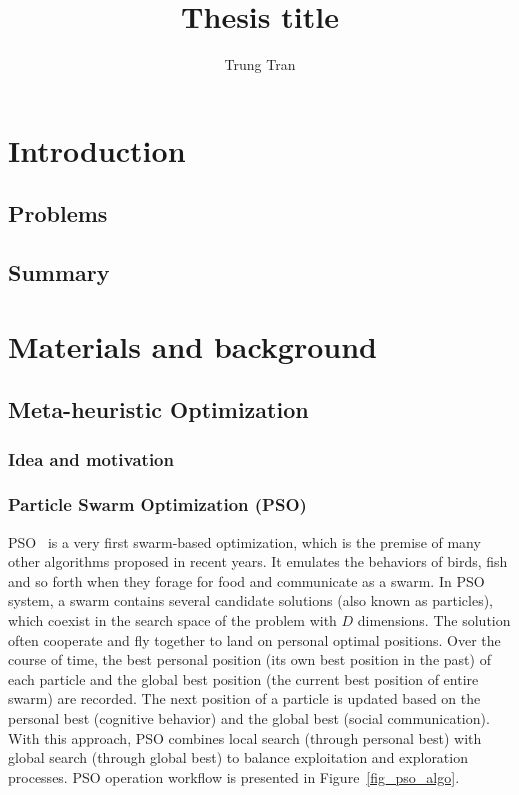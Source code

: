 \documentclass[a4paper,13pt,2p]{report}
\begin{document}
\setlength{\abovedisplayskip}{3pt}
\setlength{\belowdisplayskip}{3pt}

\title{\LARGE {\bf Thesis title}\\
}

\author{Trung Tran}

\normallinespacing
\maketitle


\body

\chapter{Introduction}
\label{ch:introduction}
\section{Problems}
\section{Summary}


\chapter{Materials and background}
\label{ch:background}


\section{Meta-heuristic Optimization}
\label{sec:meta_heuristic}
\subsection{Idea and motivation}
\label{meta_heuristic_idea}

\subsection{Particle Swarm Optimization (PSO)}
\label{pso_standard}
PSO~\cite{kennedy2010particle} is a very first swarm-based optimization, which is the premise of many other algorithms proposed in recent years. It emulates the behaviors of birds, fish and so forth when they forage for food and communicate as a swarm. In PSO system, a swarm contains several candidate solutions (also known as particles), which coexist in the search space of the problem with $D$ dimensions. The solution often cooperate and fly together to land on personal optimal positions. Over the course of time, the best personal position (its own best position in the past) of each particle and the global best position (the current best position of entire swarm) are recorded. The next position of a particle is updated based on the personal best (cognitive behavior) and the global best (social communication). With this approach, PSO combines local search (through personal best) with global search (through global best) to balance exploitation and exploration processes. PSO operation workflow is presented in Figure~\ref{fig_pso_algo}.
	 
\end{document}
